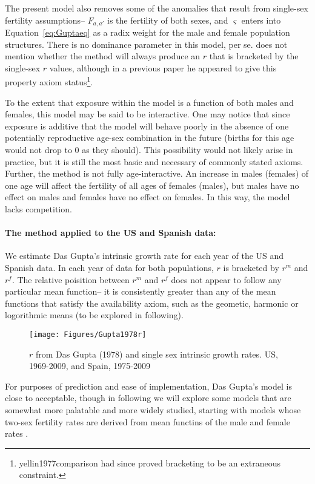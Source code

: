 The present model also removes some of the anomalies that
result from single-sex fertility assumptions-- $F_{a,a'}$ is the fertility of
both sexes, and $\varsigma$ enters into Equation~\eqref{eq:Guptaeq} as a radix
weight for the male and female population structures. There is no dominance
parameter in this model, per se. \citet{gupta1978alternative} does not mention
whether the method will always produce an $r$ that is bracketed by the
single-sex $r$ values, although in a previous paper
\citep{gupta1976interactive} he appeared to give this property axiom
status\footnote{yellin1977comparison had since proved bracketing to be an
extraneous constraint.}.
 
 To the extent that exposure within the model is a function of both males and
 females, this model may be said to be interactive. One may notice that since
 exposure is additive that the model will behave poorly in the absence of one
 potentially reproductive age-sex combination in the future (births for this
 age would not drop to 0 as they should). This possibility would not likely
 arise in practice, but it is still the most basic and necessary of
 commonly stated axioms. Further, the method is not fully age-interactive. An
 increase in males (females) of one age will affect the fertility of all ages of
 females (males), but males have no effect on males and females have no effect
 on females. In this way, the model lacks competition.

\paragraph{The method applied to the US and Spanish data: } We estimate Das
Gupta's intrinsic growth rate for each year of the US and Spanish data. In each
year of data for both populations, $r$ is bracketed by $r^m$ and $r^f$. The
relative poisition between $r^m$ and $r^f$ does not appear to follow any
particular mean function-- it is consistently greater than any of the mean
functions that satisfy the availability axiom, such as the geometic, harmonic or
logorithmic means (to be explored in following).

\begin{figure}[ht!]
        \centering  
          \caption{$r$ from Das Gupta (1978) and single sex intrinsic growth rates. US, 1969-2009, and Spain, 1975-2009}
           \texttt{[image: Figures/Gupta1978r]}
          \label{fig:Gupta1978r}
\end{figure}

For purposes of prediction and ease of implementation, Das Gupta's model is
close to acceptable, though in following we will explore some models that are
somewhat more palatable and more widely studied, starting with models whose
two-sex fertility rates are derived from mean functins of the male
and female rates \citet{schoen1981harmonic}.

\FloatBarrier

